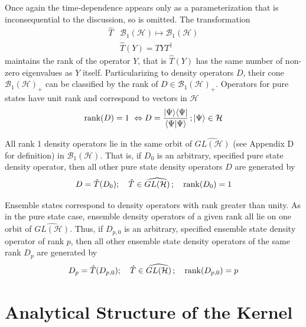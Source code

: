 \documentclass[aps,preprint]{revtex4}%
\begin{document}
\noindent Once again the time-dependence appears only as a parameterization
that is inconsequential to the discussion, so is omitted. The transformation
\begin{align}
\hat{T}  &  \mathcal{B}_{1}(\mathcal{H})\mapsto\mathcal{B}_{1}\left(
\mathcal{H}\right) \nonumber\\
&  \hat{T}(Y)=TYT^{\dagger}%
\end{align}
maintains the rank of the operator $Y$, that is $\hat{T}(Y)$ has the same
number of non-zero eigenvalues as $Y$ itself. Particularizing to density
operators $D$, their cone $\mathcal{B}_{1}(\mathcal{H})_{+}$ can be classified
by the rank of $D\in\mathcal{B}_{1}(\mathcal{H})_{+}$. Operators for pure
states have unit rank and correspond to vectors in $\mathcal{H}$
\begin{equation}
\mathop{\rm rank}\nolimits(D)=1\,\,\Leftrightarrow D=\frac{|\Psi\rangle
\langle\Psi|}{\langle\Psi|\Psi\rangle}\,;|\Psi\rangle\in\mathcal{H}%
\end{equation}


All rank 1 density operators lie in the same orbit of $\widehat{GL(\mathcal{H}%
)} $ (see Appendix D for definition) in $\mathcal{B}_{1}(\mathcal{H})$. That
is, if $D_{0}$ is an arbitrary, specified pure state density operator, then
all other pure state density operators $D$ are generated by
\begin{equation}
D=\hat{T}(D_{0});\quad\hat{T}\in\widehat{GL(\mathcal{H})}\,;\quad
\mathop{\rm rank}\nolimits(D_{0})=1
\end{equation}


Ensemble states correspond to density operators with rank greater than unity.
As in the pure state case, ensemble density operators of a given rank all lie
on one orbit of $\widehat{GL(\mathcal{H})}$. Thus, if $D_{p,0}$ is an
arbitrary, specified ensemble state density operator of rank $p$, then all
other ensemble state density operators of the same rank $D_{p}$ are generated
by
\begin{equation}
D_{p}=\hat{T}(D_{p,0});\quad\hat{T}\in\widehat{GL(\mathcal{H})}\,;\quad
\mathop{\rm rank}\nolimits(D_{p,0})=p
\end{equation}


\section{Analytical Structure of the Kernel}
\end{document}
